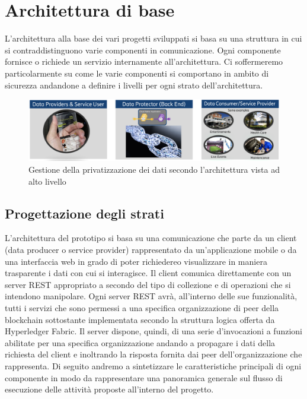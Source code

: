 \section{Architettura di base}
L'architettura alla base dei vari progetti sviluppati si basa su una struttura in cui si contraddistinguono varie componenti in comunicazione. Ogni componente fornisce o richiede un servizio internamente all'architettura. Ci soffermeremo particolarmente su come le varie componenti si comportano in ambito di sicurezza andandone a definire i livelli per ogni strato dell'architettura.
\begin{figure}[h]
    \centering
    \includegraphics[width=1\textwidth]{img/structure-project-ericsson.png}
    \caption{Gestione della privatizzazione dei dati secondo l'architettura vista ad alto livello}
    \label{fig:architecture-private-diagram}
\end{figure}
\subsection{Progettazione degli strati }
L'architettura del prototipo si basa su una comunicazione che parte da un client (data producer o service provider) rappresentato da un'applicazione mobile o da una interfaccia web in grado di poter richiedereo visualizzare in maniera trasparente i dati con cui si interagisce. Il client comunica direttamente con un server REST appropriato a secondo del tipo di collezione e di operazioni che si intendono manipolare. Ogni server REST avrà, all'interno delle sue funzionalità, tutti i servizi che sono permessi a una specifica organizzazione di peer della blockchain sottostante implementata secondo la struttura logica offerta da Hyperledger Fabric. Il server dispone, quindi, di una serie d'invocazioni a funzioni abilitate per una specifica organizzazione andando a propagare i dati della richiesta del client e inoltrando la risposta fornita dai peer dell'organizzazione che rappresenta. Di seguito andremo a sintetizzare le caratteristiche principali di ogni componente in modo da rappresentare una panoramica generale sul flusso di esecuzione delle attività proposte all'interno del progetto.
